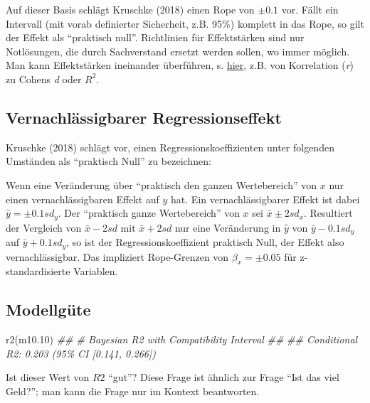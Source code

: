 \documentclass[
  a4paper,
  DIV=11]{scrreprt}
\newenvironment{Shaded}{\begin{snugshade}}{\end{snugshade}}
\newcommand{\DocumentationTok}[1]{\textcolor[rgb]{0.37,0.37,0.37}{\textit{#1}}}
\newcommand{\FloatTok}[1]{\textcolor[rgb]{0.68,0.00,0.00}{#1}}
\newcommand{\FunctionTok}[1]{\textcolor[rgb]{0.28,0.35,0.67}{#1}}
\newcommand{\NormalTok}[1]{\textcolor[rgb]{0.00,0.23,0.31}{#1}}
\theoremstyle{definition}
\theoremstyle{remark}
\begin{document}
Auf dieser Basis schlägt Kruschke (2018) einen Rope von \(\pm0.1\) vor.
Fällt ein Intervall (mit vorab definierter Sicherheit, z.B. 95\%)
komplett in das Rope, so gilt der Effekt als ``praktisch null''.
Richtlinien für Effektstärken sind nur Notlösungen, die durch
Sachverstand ersetzt werden sollen, wo immer möglich. Man kann
Effektstärken ineinander überführen, s.
\href{https://www.escal.site/}{hier}, z.B. von Korrelation (\emph{r}) zu
Cohens \emph{d} oder \(R^2\).

\hypertarget{vernachluxe4ssigbarer-regressionseffekt}{%
\subsection{Vernachlässigbarer
Regressionseffekt}\label{vernachluxe4ssigbarer-regressionseffekt}}

Kruschke (2018) schlägt vor, einen Regressionskoeffizienten unter
folgenden Umständen als ``praktisch Null'' zu bezeichnen:

Wenn eine Veränderung über ``praktisch den ganzen Wertebereich'' von
\(x\) nur einen vernachlässigbaren Effekt auf \(y\) hat. Ein
vernachlässigbarer Effekt ist dabei \(\hat{y}= \pm 0.1 sd_y\). Der
``praktisch ganze Wertebereich'' von \(x\) sei \(\bar{x} \pm 2 sd_x\).
Resultiert der Vergleich von \(\bar{x} -2 sd\) mit \(\bar{x}+2sd\) nur
eine Veränderung in \(\hat{y}\) von \(\bar{y} - 0.1sd_y\) auf
\(\bar{y} + 0.1 sd_y\), so ist der Regressionskoeffizient praktisch
Null, der Effekt also vernachlässigbar. Das impliziert Rope-Grenzen von
\(\beta_x = \pm 0.05\) für z-standardisierte Variablen.

\hypertarget{modellguxfcte}{%
\subsection{Modellgüte}\label{modellguxfcte}}

\begin{Shaded}
\begin{Highlighting}[]
\FunctionTok{r2}\NormalTok{(m10}\FloatTok{.10}\NormalTok{)}
\DocumentationTok{\#\# \# Bayesian R2 with Compatibility Interval}
\DocumentationTok{\#\# }
\DocumentationTok{\#\#   Conditional R2: 0.203 (95\% CI [0.141, 0.266])}
\end{Highlighting}
\end{Shaded}

Ist dieser Wert von \(R2\) ``gut''? Diese Frage ist ähnlich zur Frage
``Ist das viel Geld?''; man kann die Frage nur im Kontext beantworten.
\end{document}
